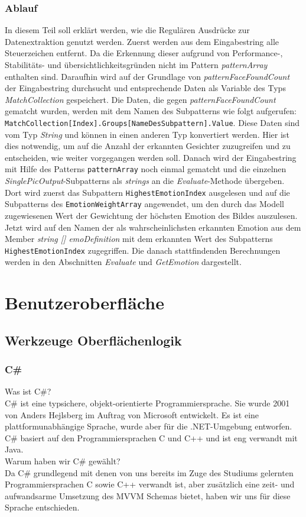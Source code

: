 \documentclass[12pt,a4paper,headinclude,twoside, plainheadsepline, open=right,numbers=noenddot]{scrreprt}
\begin{document}
\subsubsection{Ablauf}
In diesem Teil soll erkl\"{a}rt werden, wie die Regul\"{a}ren Ausdr\"{u}cke zur Datenextraktion genutzt werden. Zuerst werden aus dem Eingabestring alle Steuerzeichen entfernt. Da die Erkennung dieser aufgrund
 von Performance-, Stabilit\"{a}ts- und \"{u}bersichtlichkeitsgr\"{u}nden nicht im Pattern \textit{patternArray} enthalten sind. Daraufhin wird auf der Grundlage von \textit{patternFaceFoundCount}
 der Eingabestring durchsucht und entsprechende Daten als Variable des Typs \textit{MatchCollection} gespeichert. Die Daten, die gegen \textit{patternFaceFoundCount} gematcht wurden, werden mit dem Namen
 des Subpatterns wie folgt aufgerufen: \texttt{MatchCollection[Index].Groups[NameDesSubpattern].Value}. Diese Daten sind vom Typ \textit{String} und k\"{o}nnen  in einen anderen Typ konvertiert werden. Hier ist dies notwendig, um auf die Anzahl der erkannten Gesichter zuzugreifen und zu entscheiden, wie weiter vorgegangen werden soll.
 Danach wird der Eingabestring mit Hilfe des Patterns \texttt{patternArray} noch einmal gematcht und die einzelnen \textit{SinglePicOutput}-Subpatterns als \textit{strings} an die \textit{Evaluate}-Methode \"{u}bergeben. Dort wird zuerst das Subpattern \texttt{HighestEmotionIndex} ausgelesen und auf die Subpatterns des \texttt{EmotionWeightArray} angewendet, um den durch das Modell zugewiesenen Wert der Gewichtung der h\"{o}chsten Emotion des Bildes auszulesen. Jetzt wird auf den Namen der als wahrscheinlichsten erkannten Emotion aus dem Member \textit{string [] emoDefinition} mit dem erkannten Wert des Subpatterns \texttt{HighestEmotionIndex} zugegriffen. Die danach stattfindenden Berechnungen werden in den Abschnitten \textit{Evaluate} und \textit{GetEmotion} dargestellt. 


\section{Benutzeroberfläche}

\subsection{Werkzeuge Oberflächenlogik} %
\subsubsection{C\#}
Was ist C\#? \\
C\# ist eine typsichere, objekt-orientierte Programmiersprache. Sie wurde 2001 von Anders Hejlsberg im Auftrag von Microsoft entwickelt. Es ist eine plattformunabhängige Sprache, wurde aber für die .NET-Umgebung entworfen. C\# basiert auf den Programmiersprachen C und C++ und ist eng verwandt mit Java\cite{Shildt2010}.\\
Warum haben wir C\# gewählt? \\
Da C\# grundlegend mit denen von uns bereits im Zuge des Studiums gelernten Programmiersprachen C sowie C++ verwandt ist, aber zusätzlich eine zeit- und aufwandsarme Umsetzung des MVVM Schemas bietet, haben wir uns für diese Sprache entschieden.
\end{document}
